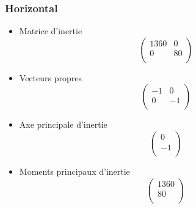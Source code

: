 \documentclass[a4paper,12pt]{report}
\begin{document}
\subsubsection*{Horizontal}
\begin{itemize}
\item Matrice d'inertie 
\[
   \left (
   \begin{array}{cc}
      1360 & 0 \\
      0 & 80 \\
   \end{array}
   \right )
\]

\item Vecteurs propres
\[
   \left (
   \begin{array}{cc}
      -1 & 0  \\
      0 & -1 \\
   \end{array}
   \right )
\]

\item Axe principale d'inertie
\[
   \left (
   \begin{array}{c}
      0 \\
      -1 \\
   \end{array}
   \right )
\]

\item Moments principaux d'inertie
\[
   \left (
   \begin{array}{c}
      1360 \\
      80 \\
   \end{array}
   \right )
\]

\end{itemize}
\end{document}
